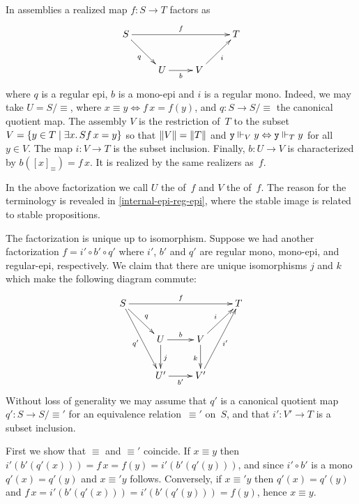 In assemblies a realized map $f : S \to T$ factors as
%
\begin{equation*}
  \xymatrix{
    {S}
    \ar[rrr]^{f}
    \ar[rd]_{q}
    &
    &
    &
    {T}
    \\
    &
    {U}
    \ar[r]_{b}
    &
    {V}
    \ar[ru]_{i}
    &
  }
\end{equation*}
%
where $q$ is a regular epi, $b$ is a mono-epi and $i$ is a regular
mono. Indeed, we may take $U = S/{\equiv}$, where $x
\equiv y \iff f\,x = f(y)$, and $q : S \to S/{\equiv}$ the
canonical quotient map. The assembly $V$ is the restriction
of~$T$ to the subset $V = \set{y \in T \such \some{x}{S}{f\,x =
    y}}$ so that $\T{V} = \T{T}$ and $\R{y} \rz[V] y \liff \R{y} \rz[T] y$
for all $y \in V$. The map $i : V \to T$ is the subset inclusion.
Finally, $b : U \to V$ is characterized by $b([x]_{\equiv}) = f\,x$.
It is realized by the same realizers as~$f$.

In the above factorization we call $U$ the  of~$f$
and $V$ the  of~$f$. The reason for the
terminology is revealed in \cref{internal-epi-reg-epi}, where
the stable image is related to stable propositions.

The factorization is unique up to isomorphism. Suppose we had another
factorization $f = i' \circ b' \circ q'$ where $i'$, $b'$ and $q'$ are
regular mono, mono-epi, and regular-epi, respectively. We claim that
there are unique isomorphisms $j$ and $k$ which make the following
diagram commute:
%
\begin{equation*}
  \xymatrix{
    {S}
    \ar[rrr]^{f}
    \ar[rd]^{q}
    \ar[rdd]_{q'}
    &
    &
    &
    {T}
    \\
    &
    {U}
    \ar[r]^{b}
    \ar[d]^{j}
    &
    {V}
    \ar[ru]^{i}
    \ar[d]_{k}
    &
    \\
    &
    {U'}
    \ar[r]_{b'}
    &
    {V'}
    \ar[ruu]_{i'}
    &    
  }
\end{equation*}
%
Without loss of generality we may assume that $q'$ is a canonical
quotient map $q' : S \to S/{\equiv'}$ for an equivalence
relation~$\equiv'$ on~$S$, and that $i' : V' \to T$ is a subset
inclusion.

First we show that $\equiv$ and $\equiv'$ coincide. If $x \equiv y$
then $i'(b'(q'(x))) = f\,x = f(y) = i'(b'(q'(y)))$, and since $i'
\circ b'$ is a mono $q'(x) = q'(y)$ and $x \equiv' y$ follows.
Conversely, if $x \equiv' y$ then $q'(x) = q'(y)$ and $f\,x =
i'(b'(q'(x))) = i'(b'(q'(y))) = f(y)$, hence $x \equiv y$.


